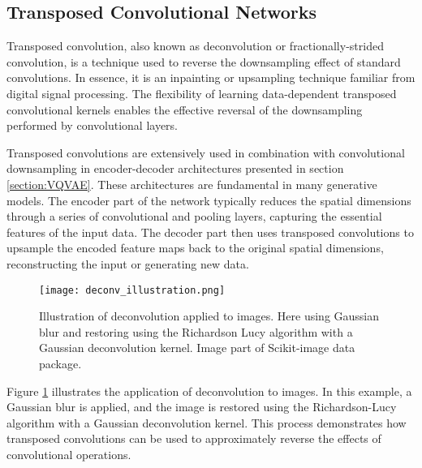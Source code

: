 \documentclass[../../thesis.tex]{subfiles}
\begin{document}
\subsection{Transposed Convolutional Networks}
Transposed convolution, also known as deconvolution or fractionally-strided convolution, is a technique used to reverse the downsampling effect of standard convolutions. In essence, it is an inpainting or upsampling technique familiar from digital signal processing. The flexibility of learning data-dependent transposed convolutional kernels enables the effective reversal of the downsampling performed by convolutional layers.\newline

Transposed convolutions are extensively used in combination with convolutional downsampling in encoder-decoder architectures presented in section \ref{section:VQVAE}. These architectures are fundamental in many generative models. The encoder part of the network typically reduces the spatial dimensions through a series of convolutional and pooling layers, capturing the essential features of the input data. The decoder part then uses transposed convolutions to upsample the encoded feature maps back to the original spatial dimensions, reconstructing the input or generating new data.\newline

\begin{figure}[h]
    \centering
    \texttt{[image: deconv\_illustration.png]}
    \caption{Illustration of deconvolution applied to images. Here using Gaussian blur and restoring using the Richardson Lucy algorithm with a Gaussian deconvolution kernel. Image part of Scikit-image data package.}
    \label{fig:deconv}
\end{figure}


Figure \ref{fig:deconv} illustrates the application of deconvolution to images. In this example, a Gaussian blur is applied, and the image is restored using the Richardson-Lucy algorithm with a Gaussian deconvolution kernel. This process demonstrates how transposed convolutions can be used to approximately reverse the effects of convolutional operations.



\end{document}
